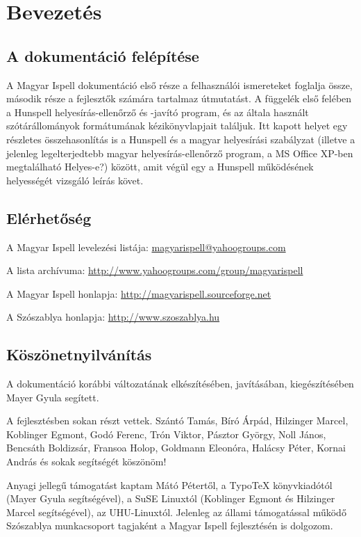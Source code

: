 
\chapter{Bevezetés}

\section{A dokumentáció felépítése}

A Magyar Ispell dokumentáció első része a
felhasználói ismereteket foglalja össze, második része a
fejlesztők számára tartalmaz útmutatást. A függelék első felében
a Hunspell helyesírás-ellenőrző és -javító program, és az
általa használt szótárállományok formátumának kézikönyvlapjait
találjuk. Itt kapott helyet  egy részletes összehasonlítás
is a Hunspell és a magyar
helyesírási szabályzat (illetve a jelenleg legelterjedtebb magyar
helyesírás-ellenőrző program, a MS Office XP-ben megtalálható
Helyes-e?) között, amit végül egy a Hunspell működésének
helyességét vizsgáló leírás követ.

\section{Elérhetőség}

A Magyar Ispell levelezési listája: \url{magyarispell@yahoogroups.com}

A lista archívuma: \url{http://www.yahoogroups.com/group/magyarispell}

A Magyar Ispell honlapja: \url{http://magyarispell.sourceforge.net}

A Szószablya honlapja: \url{http://www.szoszablya.hu}

\section{Köszönetnyilvánítás}

A dokumentáció korábbi változatának elkészítésében, javításában,
kiegészítésében Mayer Gyula segített.

A fejlesztésben sokan részt vettek. Szántó Tamás, Bíró Árpád, Hilzinger Marcel,
Koblinger Egmont, Godó Ferenc, Trón Viktor, Pásztor György, Noll János,
Bencsáth Boldizsár, Fransoa Holop, Goldmann Eleonóra, Halácsy Péter,
Kornai András és sokak segítségét köszönöm!

Anyagi jellegű támogatást kaptam Mátó Pétertől, a
Typo\TeX{} könyvkiadótól (Mayer Gyula segítségével), a SuSE Linuxtól (Koblinger
Egmont és Hilzinger Marcel segítségével), az UHU-Linuxtól. Jelenleg
az állami támogatással működő Szószablya munkacsoport tagjaként a
Magyar Ispell fejlesztésén is dolgozom.

